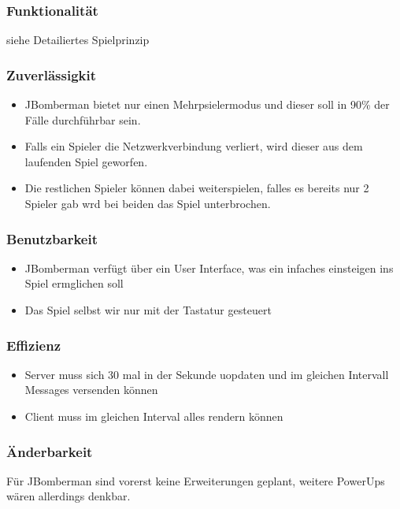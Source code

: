 \documentclass[11pt]{scrartcl}
\begin{document}
\subsubsection{Funktionalität}
\label{sec:Funktionalität}
siehe Detailiertes Spielprinzip


\subsubsection{Zuverlässigkit}
\label{sec:Zuverlässigkeit}
\begin{itemize}
    \item JBomberman bietet nur einen Mehrpsielermodus und dieser soll in 90\% der Fälle durchführbar sein.
    \item Falls ein Spieler die Netzwerkverbindung verliert, wird dieser aus dem laufenden Spiel geworfen.
    \item Die restlichen Spieler können dabei weiterspielen, falles es bereits nur 2 Spieler gab wrd bei beiden das Spiel unterbrochen.
\end{itemize}

\subsubsection{Benutzbarkeit}
\label{sec:Benutzbarkeit}
\begin{itemize}
    \item JBomberman verfügt über ein User Interface, was ein infaches einsteigen ins Spiel ermglichen soll
    \item Das Spiel selbst wir nur mit der Tastatur gesteuert
\end{itemize}

\subsubsection{Effizienz}
\label{sec:Effizienz}
\begin{itemize}
    \item Server muss sich 30 mal in der Sekunde uopdaten und im gleichen Intervall Messages versenden können
    \item Client muss im gleichen Interval alles rendern können
\end{itemize}

\subsubsection{Änderbarkeit}
\label{sec:Änderbarkeit}
Für JBomberman sind vorerst keine Erweiterungen geplant, weitere PowerUps wären allerdings denkbar.
\end{document}
